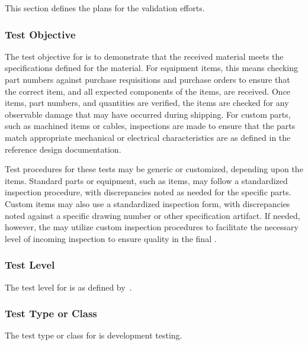


This section defines the plans for the \TestIdNameX validation efforts.

\subsubsection{Test Objective}
\label{loc:TestObjective\TestIdName}

The test objective for \TestIdNameX is to demonstrate that the received material meets the specifications defined for the material.
For equipment items, this means checking part numbers against purchase requisitions and purchase orders to ensure that the correct item, and all expected components of the items, are received.
Once items, part numbers, and quantities are verified, the items are checked for any observable damage that may have occurred during shipping.
For custom parts, such as machined items or cables, inspections are made to ensure that the parts match appropriate mechanical or electrical characteristics are as defined in the reference design documentation.

Test procedures for these tests may be generic or customized, depending upon the items.
Standard parts or equipment, such as \COTS items, may follow a standardized inspection procedure, with discrepancies noted as needed for the specific parts.
Custom items may also use a standardized inspection form, with discrepancies noted against a specific drawing number or other specification artifact.
If needed, however, the \TestIdNameX may utilize custom inspection procedures to facilitate the necessary level of incoming inspection to ensure quality in the final \ThisSys.

\subsubsection{Test Level}
\label{loc:TestLevels\TestIdName}

The test level for \TestIdNameX is \StageOne as defined by~\citeStageTestingSTD.

\subsubsection{Test Type or Class}
\label{loc:TestType\TestIdName}

The test type or class for \TestIdNameX is development testing.


